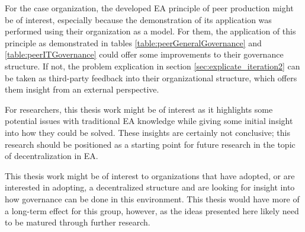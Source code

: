 For the case organization, the developed EA principle of peer production might be of interest, especially because the demonstration of its application was performed using their organization as a model. For them, the application of this principle as demonstrated in tables \ref{table:peerGeneralGovernance} and \ref{table:peerITGovernance} could offer some improvements to their governance structure. If not, the problem explication in section \ref{sec:explicate_iteration2} can be taken as third-party feedback into their organizational structure, which offers them insight from an external perspective. 

For researchers, this thesis work might be of interest as it highlights some potential issues with traditional EA knowledge while giving some initial insight into how they could be solved. These insights are certainly not conclusive; this research should be positioned as a starting point for future research in the topic of decentralization in EA. 

This thesis work might be of interest to organizations that have adopted, or are interested in adopting, a decentralized structure and are looking for insight into how governance can be done in this environment. This thesis would have more of a long-term effect for this group, however, as the ideas presented here likely need to be matured through further research.  

